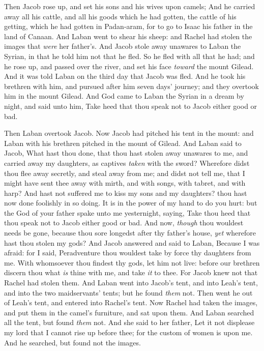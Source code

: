 \documentclass[11pt,letterpaper,oneside]{memoir}
\begin{document}
Then Jacob rose up, and set his sons and his wives upon camels; And he
carried away all his cattle, and all his goods which he had gotten, the
cattle of his getting, which he had gotten in Padan-aram, for to go to
Isaac his father in the land of Canaan. And Laban went to shear his
sheep: and Rachel had stolen the images that \emph{were} her father's.
And Jacob stole away unawares to Laban the Syrian, in that he told him
not that he fled. So he fled with all that he had; and he rose up, and
passed over the river, and set his face \emph{toward} the mount Gilead.
And it was told Laban on the third day that Jacob was fled. And he took
his brethren with him, and pursued after him seven days' journey; and
they overtook him in the mount Gilead. And God came to Laban the Syrian
in a dream by night, and said unto him, Take heed that thou speak not to
Jacob either good or bad.

Then Laban overtook Jacob. Now Jacob had pitched his tent in the mount:
and Laban with his brethren pitched in the mount of Gilead. And Laban
said to Jacob, What hast thou done, that thou hast stolen away unawares
to me, and carried away my daughters, as captives \emph{taken} with the
sword? Wherefore didst thou flee away secretly, and steal away from me;
and didst not tell me, that I might have sent thee away with mirth, and
with songs, with tabret, and with harp? And hast not suffered me to kiss
my sons and my daughters? thou hast now done foolishly in so doing. It
is in the power of my hand to do you hurt: but the God of your father
spake unto me yesternight, saying, Take thou heed that thou speak not to
Jacob either good or bad. And now, \emph{though} thou wouldest needs be
gone, because thou sore longedst after thy father's house, \emph{yet}
wherefore hast thou stolen my gods? And Jacob answered and said to
Laban, Because I was afraid: for I said, Peradventure thou wouldest take
by force thy daughters from me. With whomsoever thou findest thy gods,
let him not live: before our brethren discern thou what \emph{is} thine
with me, and take \emph{it} to thee. For Jacob knew not that Rachel had
stolen them. And Laban went into Jacob's tent, and into Leah's tent, and
into the two maidservants' tents; but he found \emph{them} not. Then
went he out of Leah's tent, and entered into Rachel's tent. Now Rachel
had taken the images, and put them in the camel's furniture, and sat
upon them. And Laban searched all the tent, but found \emph{them} not.
And she said to her father, Let it not displease my lord that I cannot
rise up before thee; for the custom of women is upon me. And he
searched, but found not the images.
\end{document}
